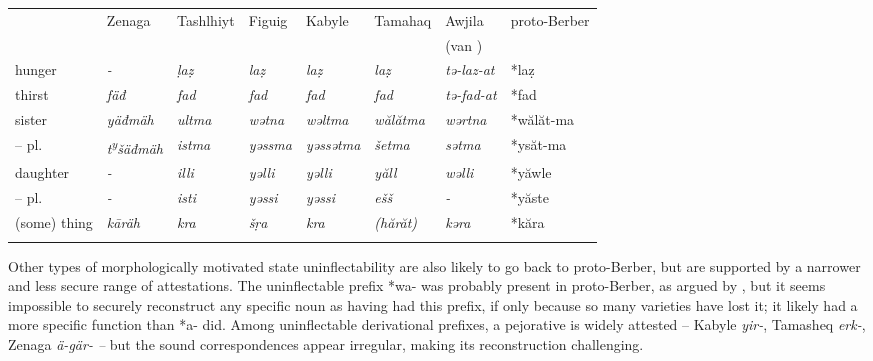 \documentclass[output=paper]{langscibook}
\begin{document}
\begin{tabularx}{\textwidth}{XXXXXXXX}
 & Zenaga & Tashlhiyt & Figuig & Kabyle & Tamahaq & Awjila & proto-Berber\\
\lsptoprule
& \citep{Taine-Cheikh2008} & \citep{Destaing1920} & \citep{Kossmann1997} & \citep{Dallet1982} & \citep{Prasse2010} & (van \citealt{Putten2013}) & \\
hunger & \textit{{}-} & \textit{ḷaẓ} & \textit{laẓ} & \textit{laẓ} & \textit{laẓ} & \textit{tə-laz-at} & *laẓ\\
thirst & \textit{fäđ} & \textit{fad} & \textit{fad} & \textit{fad} & \textit{fad} & \textit{tə-fad-at} & *fad\\
sister & \textit{yäđmäh} & \textit{ultma} & \textit{wətna} & \textit{wəltma} & \textit{wălătma} & \textit{wərtna} & *wălăt-ma\\
– pl. & \textit{t\textsuperscript{y}}\textit{šäđmäh} & \textit{istma} & \textit{yəssma} & \textit{yəssətma} & \textit{šetma} & \textit{sətma} & *ysăt-ma\\
daughter & \textit{{}-} & \textit{illi} & \textit{yəlli} & \textit{yəlli} & \textit{yăll} & \textit{wəlli} & *yăwle\\
– pl. & \textit{{}-} & \textit{isti} & \textit{yəssi} & \textit{yəssi} & \textit{ešš} & \textit{{}-} & *yăste\\
(some) thing & \textit{kāräh} & \textit{kra} & \textit{šṛa} & \textit{kra} & \textit{(hărăt)} & \textit{kəra} & *kăra\\
\lspbottomrule
\end{tabularx}
\begin{styleStandarduser}
Other types of morphologically motivated state uninflectability are also likely to go back to proto-Berber, but are supported by a narrower and less secure range of attestations. The uninflectable prefix *wa- was probably present in proto-Berber, as argued by \citet{Brugnatelli1998}, but it seems impossible to securely reconstruct any specific noun as having had this prefix, if only because so many varieties have lost it; it likely had a more specific function than *a- did. Among uninflectable derivational prefixes, a pejorative is widely attested – Kabyle \textit{yir-}, Tamasheq \textit{erk-}, Zenaga \textit{ä-gär- –} but the sound correspondences appear irregular, making its reconstruction challenging.
\end{styleStandarduser}
\end{document}
